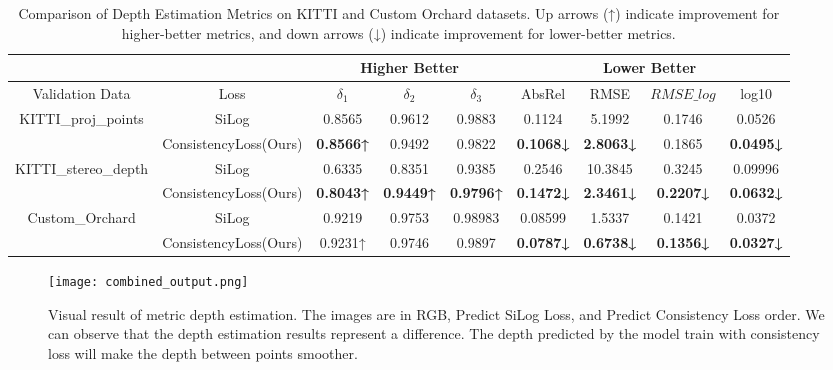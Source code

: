 \documentclass{article}
\begin{document}
    \begin{table*}[ht]
        \centering
        \begin{adjustbox}{width=\textwidth}
            \begin{tabular}{c|c|ccc|c|c|c|c}
            \hline
             \multicolumn{2}{c}{} & \multicolumn{3}{|c|}{Higher Better} & \multicolumn{4}{c}{Lower Better} \\ 
            \hline
            Validation Data  & Loss & $\delta_1$ & $\delta_2$ & $\delta_3$ & AbsRel & RMSE & $RMSE\_log$ & log10 \\
            \hline
       
               \multirow{2}{*}{KITTI\_{proj\_points}}  
                & SiLog                  & 0.8565 & 0.9612 & 0.9883 & 0.1124 & 5.1992  & 0.1746 & 0.0526 \\
                & ConsistencyLoss(Ours)   & \textbf{0.8566↑} & 0.9492 & 0.9822 & \textbf{0.1068↓} & \textbf{2.8063↓}  & 0.1865 & \textbf{0.0495↓} \\
            \hline
    
                 \multirow{2}{*}{KITTI\_{stereo\_depth}} 
                & SiLog                  & 0.6335 & 0.8351 & 0.9385 & 0.2546 & 10.3845 & 0.3245 & 0.09996 \\
                & ConsistencyLoss(Ours)   & \textbf{0.8043↑} & \textbf{0.9449↑} & \textbf{0.9796↑} & \textbf{0.1472↓} & \textbf{2.3461↓}  & \textbf{0.2207↓} & \textbf{0.0632↓} \\
            \hline

                \multirow{2}{*}{Custom\_Orchard} 
                & SiLog                  & 0.9219 & 0.9753 & 0.98983 & 0.08599 & 1.5337 & 0.1421 & 0.0372 \\
                & ConsistencyLoss(Ours)   & 0.9231↑ & 0.9746 & 0.9897 & \textbf{0.0787↓} & \textbf{0.6738↓}  & \textbf{0.1356↓} & \textbf{0.0327↓} \\
            \hline
            \end{tabular}
        \end{adjustbox}
        \caption{Comparison of Depth Estimation Metrics on KITTI and Custom Orchard datasets. Up arrows (↑) indicate improvement for higher-better metrics, and down arrows (↓) indicate improvement for lower-better metrics.}
        \label{tab:comparison_metrics}
    \end{table*}

    \begin{figure*}[ht]
        \centering
        \texttt{[image: combined\_output.png]}
        \caption{Visual result of metric depth estimation. The images are in RGB, Predict SiLog Loss, and Predict Consistency Loss order. We can observe that the depth estimation results represent a difference. The depth predicted by the model train with consistency loss will make the depth between points smoother.}
        \label{fig:result display}
    \end{figure*}
    
\end{document}
